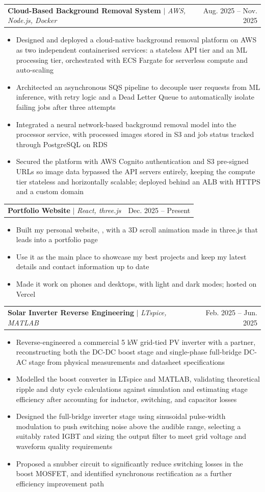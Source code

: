 \documentclass[letterpaper,11pt]{article}
\makeatletter
\newcommand{\myuline}[1]{%
  \uline{\phantom{#1}}%
  \llap{\contour{white}{#1}}%
}
\newcommand{\resumeItem}[1]{
  \item\small{
    {#1 \vspace{-1pt}}
  }
}
\newcommand{\resumeProjectHeading}[2]{
    \item
    \begin{tabular*}{\textwidth}{l@{\extracolsep{\fill}}r}
      #1 & {\color{dark-grey}\small #2} \\
    \end{tabular*}\vspace{-4pt}
}
\newcommand{\resumeItemListStart}{\begin{itemize}}
\newcommand{\resumeItemListEnd}{\end{itemize}\vspace{0pt}}
\makeatother
\begin{document}
      \resumeProjectHeading
          {\textbf{Cloud-Based Background Removal System} $|$ \emph{AWS, Node.js, Docker}}{Aug. 2025 -- Nov. 2025}
          \resumeItemListStart
            \resumeItem{Designed and deployed a cloud-native background removal platform on AWS as two independent containerised services: a stateless API tier and an ML processing tier, orchestrated with ECS Fargate for serverless compute and auto-scaling}
            \resumeItem{Architected an asynchronous SQS pipeline to decouple user requests from ML inference, with retry logic and a Dead Letter Queue to automatically isolate failing jobs after three attempts}
            \resumeItem{Integrated a neural network-based background removal model into the processor service, with processed images stored in S3 and job status tracked through PostgreSQL on RDS}
            \resumeItem{Secured the platform with AWS Cognito authentication and S3 pre-signed URLs so image data bypassed the API servers entirely, keeping the compute tier stateless and horizontally scalable; deployed behind an ALB with HTTPS and a custom domain}
          \resumeItemListEnd

      \resumeProjectHeading
          {\textbf{Portfolio Website} $|$ \emph{React, three.js}}{Dec. 2025 -- Present}
          \resumeItemListStart
            \resumeItem{Built my personal website, \href{https://allensaji.com}{\myuline{allensaji.com}}, with a 3D scroll animation made in three.js that leads into a portfolio page}
            \resumeItem{Use it as the main place to showcase my best projects and keep my latest details and contact information up to date}
            \resumeItem{Made it work on phones and desktops, with light and dark modes; hosted on Vercel}
          \resumeItemListEnd

      \resumeProjectHeading
          {\textbf{Solar Inverter Reverse Engineering} $|$ \emph{LTspice, MATLAB}}{Feb. 2025 -- Jun. 2025}
          \resumeItemListStart
            \resumeItem{Reverse-engineered a commercial 5 kW grid-tied PV inverter with a partner, reconstructing both the DC-DC boost stage and single-phase full-bridge DC-AC stage from physical measurements and datasheet specifications}
            \resumeItem{Modelled the boost converter in LTspice and MATLAB, validating theoretical ripple and duty cycle calculations against simulation and estimating stage efficiency after accounting for inductor, switching, and capacitor losses}
            \resumeItem{Designed the full-bridge inverter stage using sinusoidal pulse-width modulation to push switching noise above the audible range, selecting a suitably rated IGBT and sizing the output filter to meet grid voltage and waveform quality requirements}
            \resumeItem{Proposed a snubber circuit to significantly reduce switching losses in the boost MOSFET, and identified synchronous rectification as a further efficiency improvement path}
          \resumeItemListEnd
\end{document}
